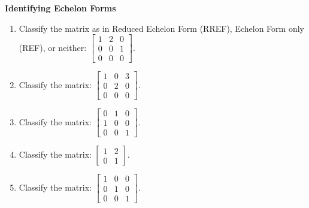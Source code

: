 \documentclass[11pt]{article}
\begin{document}
\textbf{Identifying Echelon Forms}
\begin{enumerate}[label=\textbf{1.2.\arabic*}]
    \item Classify the matrix as in Reduced Echelon Form (RREF), Echelon Form only (REF), or neither: $\left[\begin{array}{ccc} 1 & 2 & 0 \\ 0 & 0 & 1 \\ 0 & 0 & 0 \end{array}\right]$.
    \item Classify the matrix: $\left[\begin{array}{ccc} 1 & 0 & 3 \\ 0 & 2 & 0 \\ 0 & 0 & 0 \end{array}\right]$.
    \item Classify the matrix: $\left[\begin{array}{ccc} 0 & 1 & 0 \\ 1 & 0 & 0 \\ 0 & 0 & 1 \end{array}\right]$.
    \item Classify the matrix: $\left[\begin{array}{cc} 1 & 2 \\ 0 & 1 \end{array}\right]$.
    \item Classify the matrix: $\left[\begin{array}{ccc} 1 & 0 & 0 \\ 0 & 1 & 0 \\ 0 & 0 & 1 \end{array}\right]$.
\end{enumerate}
\end{document}

